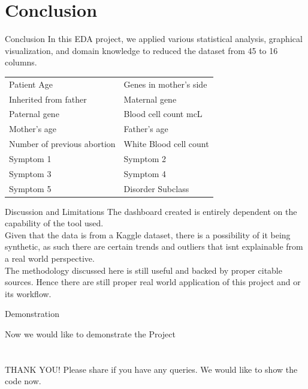 \documentclass{beamer}
\begin{document}
	\section{Conclusion}
	\begin{frame}{Conclusion}
		In this EDA project, we applied various statistical analysis, graphical visualization, and domain knowledge to reduced the dataset from 45 to 16 columns.
		\begin{table}[htpb]
			\centering
			\begin{tabular}{|l|l|}
				\hline
				Patient Age&				Genes in mother's side\\
				Inherited from father &				Maternal gene\\
				Paternal gene &				Blood cell count mcL\\
				Mother's age &				Father's age\\
				Number of previous abortion &				White Blood cell count \\
				Symptom 1 &				Symptom 2\\
				Symptom 3&				Symptom 4\\
				Symptom 5 &                     	Disorder Subclass\\ 
				\hline
			\end{tabular}
			\label{tab 2}
		\end{table}
	\end{frame}
	\begin{frame}{Discussion and Limitations}
	The dashboard created is entirely dependent on the capability of the tool used.\\ 
	Given that the data is from a Kaggle dataset, there is a possibility of it being synthetic, as such there are certain trends and outliers that isnt explainable from a real world perspective.\\
	
	The methodology discussed here is still useful and backed by proper citable sources. Hence there are still proper real world application of this project and or its workflow. 

	\end{frame}	

	\begin{frame}{Demonstration}
	\begin{center}
		{\Huge Now we  would like to demonstrate the Project} \newline \newline
		
		
	\end{center}
	
\end{frame}	

	\section*{}
	\begin{frame}
		\begin{center}
			{\Huge THANK YOU!} \newline \newline
		Please share if you have any queries.\newline \newline
		We would like to show the code now.
		
	\end{center}
	\end{frame}
	
\end{document}
